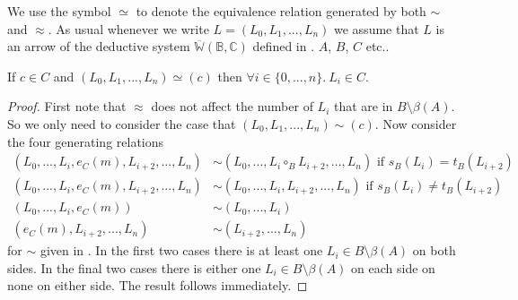 \documentclass{article}
\begin{document}
\begin{notation}
	We use the symbol $\simeq$ to denote the equivalence relation generated by both $\sim$ and $\approx$.
	As usual whenever we write $L=(L_0,L_1,...,L_n)$ we assume that $L$ is an arrow of the deductive system $\overline{\mathbb{W}}(\mathbb{B},\mathbb{C})$ defined in .
	$A$, $B$, $C$ etc..
\end{notation}

\begin{lemma}\label{all-in-C}
	If $c\in C$ and $(L_0,L_1,...,L_n)\simeq (c)$ then $\forall i\in \{0,...,n\}.~L_i\in C$.
	\begin{proof}
		First note that $\approx$ does not affect the number of $L_i$ that are in $B\setminus \beta(A)$.
		So we only need to consider the case that $(L_0,L_1,...,L_n)\sim (c)$.
		Now consider the four generating relations
		\begin{align*}
			(L_0,...,L_i,e_C(m),L_{i+2},...,L_n)&\sim (L_0,...,L_i\circ_B L_{i+2},...,L_n)\text{ if }s_B(L_i)=t_B(L_{i+2})\\
			(L_0,...,L_i,e_C(m),L_{i+2},...,L_n)&\sim (L_0,...,L_i, L_{i+2},...,L_n)\text{ if }s_B(L_i)\neq t_B(L_{i+2})\\
			(L_0,...,L_i,e_C(m))&\sim (L_0,...,L_i)\\
			(e_C(m),L_{i+2},...,L_n)&\sim (L_{i+2},...,L_n)
		\end{align*}
		for $\sim$ given in .
		In the first two cases there is at least one $L_i\in B\setminus \beta(A)$ on both sides.
		In the final two cases there is either one $L_i\in B\setminus\beta(A)$ on each side on none on either side.
		The result follows immediately.
	\end{proof}
\end{lemma}
\end{document}
